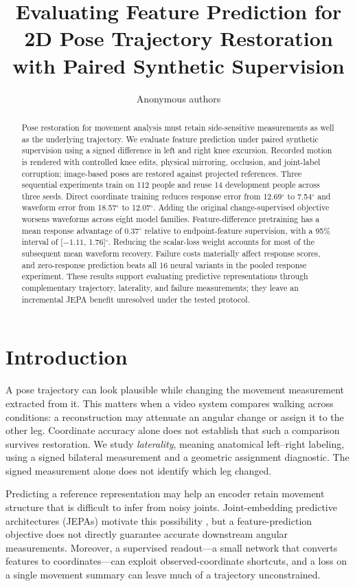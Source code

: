 \documentclass{article}
\title{Evaluating Feature Prediction for 2D Pose Trajectory Restoration with Paired Synthetic Supervision}
\author{Anonymous authors}
\newcommand{\degunit}{^{\circ}}
\begin{document}
\maketitle
\begin{abstract}
Pose restoration for movement analysis must retain side-sensitive measurements as well as the underlying trajectory. We evaluate feature prediction under paired synthetic supervision using a signed difference in left and right knee excursion. Recorded motion is rendered with controlled knee edits, physical mirroring, occlusion, and joint-label corruption; image-based poses are restored against projected references. Three sequential experiments train on 112 people and reuse 14 development people across three seeds. Direct coordinate training reduces response error from 12.69$\degunit$ to 7.54$\degunit$ and waveform error from 18.57$\degunit$ to 12.07$\degunit$. Adding the original change-supervised objective worsens waveforms across eight model families. Feature-difference pretraining has a mean response advantage of 0.37$\degunit$ relative to endpoint-feature supervision, with a 95\% interval of [$-1.11$, 1.76]$\degunit$. Reducing the scalar-loss weight accounts for most of the subsequent mean waveform recovery. Failure costs materially affect response scores, and zero-response prediction beats all 16 neural variants in the pooled response experiment. These results support evaluating predictive representations through complementary trajectory, laterality, and failure measurements; they leave an incremental JEPA benefit unresolved under the tested protocol.
\end{abstract}

\section{Introduction}
A pose trajectory can look plausible while changing the movement measurement extracted from it. This matters when a video system compares walking across conditions: a reconstruction may attenuate an angular change or assign it to the other leg. Coordinate accuracy alone does not establish that such a comparison survives restoration. We study \emph{laterality}, meaning anatomical left--right labeling, using a signed bilateral measurement and a geometric assignment diagnostic. The signed measurement alone does not identify which leg changed.

Predicting a reference representation may help an encoder retain movement structure that is difficult to infer from noisy joints. Joint-embedding predictive architectures (JEPAs) motivate this possibility \citep{assran2023ijepa,bardes2024vjepa}, but a feature-prediction objective does not directly guarantee accurate downstream angular measurements. Moreover, a supervised readout---a small network that converts features to coordinates---can exploit observed-coordinate shortcuts, and a loss on a single movement summary can leave much of a trajectory unconstrained.
\end{document}
